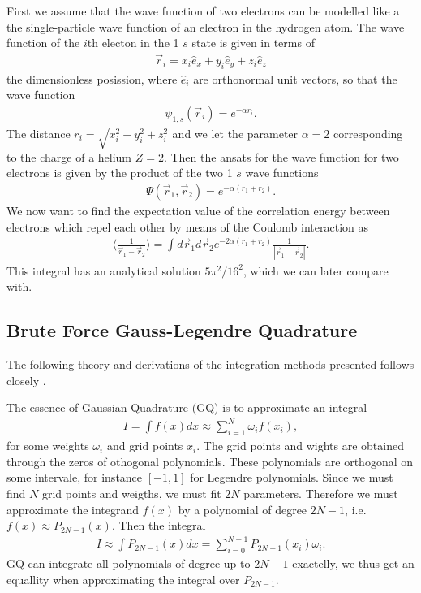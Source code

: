 \documentclass[twocolumn]{aastex62}
\begin{document}
First we assume that the wave function of two electrons can be modelled like a the single-particle wave function of an electron in the hydrogen atom. The wave function of the $i$th electon in the 1 $s$ state is given in terms of
\begin{align}
	\vec{r}_i = x_i \hat{e}_x + y_i\hat{e}_y + z_i\hat{e}_z
\end{align} 
the dimensionless posission, where $\hat{e}_i$ are orthonormal unit vectors, so that the wave function
\begin{align}
	\psi_{1,s}(\vec{r}_i) = e^{-\alpha r_i}.
\end{align}
The distance $r_i = \sqrt{x_i^2 + y_i^2 + z_i^2}$ and we let the parameter $\alpha = 2$ corresponding to the charge of a helium $Z = 2$. Then the ansats for the wave function for two electrons is given by the product of the two 1 $s$ wave functions 
\begin{align}
	\Psi(\vec{r}_1, \vec{r}_2) = e^{-\alpha(r_1 + r_2)}.
\end{align}
We now want to find the expectation value of the correlation energy between electrons which repel each other by means of the Coulomb interaction as 
\begin{align}
\langle \frac{
1}{\vec{r}_1 - \vec{r}_2}\rangle = \int d\vec{r}_1d\vec{r}_2 e^{-2\alpha(r_1 + r_2)}\frac{1}{|\vec{r}_1 - \vec{r}_2|}.
\label{eq:integral}
\end{align}
This integral has an analytical solution $5\pi^2/16^2$, which we can later compare with.
\subsection{Brute Force Gauss-Legendre Quadrature}
The following theory and derivations of the integration methods presented follows closely \citep[Ch. 5.3]{jensen:2015}. 

The essence of Gaussian Quadrature (GQ) is to approximate an integral 
\begin{align}
	I = \int f(x) dx \approx \sum^N_{i = 1} \omega_i f(x_i),
\end{align} 
for some weights $\omega_i$ and grid points $x_i$. The grid points and wights are obtained through the zeros of othogonal polynomials. These polynomials are orthogonal on some intervale, for instance $[-1, 1]$ for Legendre polynomials. Since we must find $N$ grid points and weigths, we must fit $2N$ parameters. Therefore we must approximate the integrand $f(x)$ by a polynomial of degree $2N-1$, i.e. $f(x) \approx P_{2N-1}(x)$. Then the integral 
\begin{align}
	I \approx \int P_{2N-1}(x)dx = \sum^{N-1}_{i=0}P_{2N-1}(x_i) \omega_i.
\end{align} 
GQ can integrate all polynomials of degree up to $2N-1$ exactelly, we thus get an equallity when approximating the integral over $P_{2N-1}$. 
\end{document}
